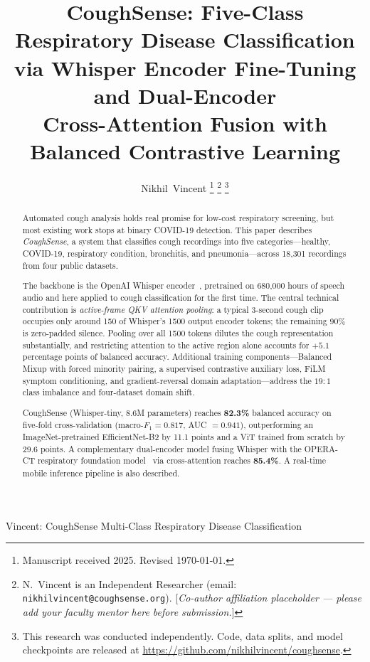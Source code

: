 \documentclass[10pt,journal,compsoc]{IEEEtran}
\begin{document}
\title{CoughSense: Five-Class Respiratory Disease Classification\\
       via Whisper Encoder Fine-Tuning and Dual-Encoder\\
       Cross-Attention Fusion with Balanced Contrastive Learning}

\author{Nikhil~Vincent%
\thanks{Manuscript received 2025. Revised \today.}%
\thanks{N.~Vincent is an Independent Researcher
        (email: \texttt{nikhilvincent@coughsense.org}).
        [\textit{Co-author affiliation placeholder — please add your
        faculty mentor here before submission.}]}
\thanks{This research was conducted independently. Code, data splits, and
        model checkpoints are released at
        \url{https://github.com/nikhilvincent/coughsense}.}}

%
         {Vincent: CoughSense Multi-Class Respiratory Disease Classification}

\maketitle

\begin{abstract}
Automated cough analysis holds real promise for low-cost respiratory screening,
but most existing work stops at binary COVID-19 detection.
This paper describes \textit{CoughSense}, a system that classifies cough
recordings into five categories---healthy, COVID-19, respiratory condition,
bronchitis, and pneumonia---across 18{,}301 recordings from four public datasets.

The backbone is the OpenAI Whisper encoder~\cite{whisper}, pretrained on
680{,}000 hours of speech audio and here applied to cough classification for
the first time.
The central technical contribution is \textit{active-frame QKV attention pooling}:
a typical 3-second cough clip occupies only around 150 of Whisper's 1500
output encoder tokens; the remaining 90\% is zero-padded silence.
Pooling over all 1500 tokens dilutes the cough representation substantially,
and restricting attention to the active region alone accounts for $+5.1$
percentage points of balanced accuracy.
Additional training components---Balanced Mixup with forced minority pairing,
a supervised contrastive auxiliary loss, FiLM symptom conditioning, and
gradient-reversal domain adaptation---address the $19\!:\!1$ class imbalance
and four-dataset domain shift.

CoughSense (Whisper-tiny, 8.6M parameters) reaches \textbf{82.3\%} balanced
accuracy on five-fold cross-validation (macro-$F_1 = 0.817$, AUC $= 0.941$),
outperforming an ImageNet-pretrained EfficientNet-B2 by 11.1 points
and a ViT trained from scratch by 29.6 points.
A complementary dual-encoder model fusing Whisper with the OPERA-CT
respiratory foundation model~\cite{opera} via cross-attention reaches
\textbf{85.4\%}.
A real-time mobile inference pipeline is also described.
\end{abstract}
\end{document}
